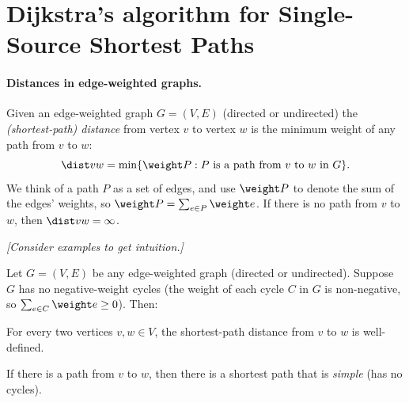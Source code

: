  \section{Dijkstra's algorithm for Single-Source Shortest Paths}\label{greedy: sec: dijkstra}

\paragraph{Distances in edge-weighted graphs.}
Given an edge-weighted graph $G=(V,E)$ (directed or undirected)
the \emph{(shortest-path) distance} from vertex $v$ to vertex $w$
is the minimum weight of any path from $v$ to $w$:
\[\dist v w = \min\{ \weight P : P \text{ is a path from $v$ to $w$ in $G$} \}.\]
We think of a path $P$ as a set of edges,
and use $\weight P$ to denote the sum of the edges' weights,
so $\weight P = \sum_{e\in P} \weight e$.
If there is no path from $v$ to $w$, then $\dist v w = \infty$.

\emph{[Consider examples to get intuition.]}

\begin{observation}\label{greedy: simple}\hypertarget{greedy.simple}{}
  Let $G=(V,E)$ be any edge-weighted graph (directed or undirected).
  Suppose $G$ has no negative-weight cycles
  (the weight of each cycle $C$ in $G$ is non-negative,
  so $\sum_{e\in C} \weight e \ge 0$).  Then:
  \begin{mylist}
  \item[(a)]
    For every two vertices $v,w\in V$,
    the shortest-path distance from $v$ to $w$ is well-defined.
  \item[(b)]
    If there is a path from $v$ to $w$,
    then there is a shortest path that is \emph{simple} (has no cycles).
  \end{mylist}
\end{observation}



